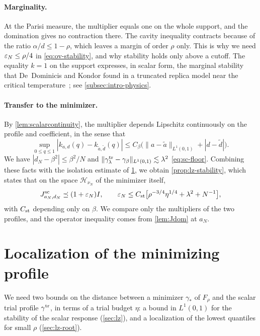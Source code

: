 \paragraph{Marginality.}
At the Parisi measure, the multiplier equals one on the whole support,
and the domination gives no contraction there. The cavity
inequality contracts because of the ratio $\alpha/d\le1-\rho$, which
leaves a margin of order $\rho$ only. This is why we need $\varepsilon_N\le\rho/4$ in
\eqref{eq:ov-stability}, and why stability holds only above a cutoff.
The equality $k=1$ on the support expresses, in scalar form, the
marginal stability that De~Dominicis and Kondor found in a truncated
replica model near the critical
temperature~\cite[pp.~606--608]{DeDominicisKondor1983}; see
\cref{subsec:intro-physics}.

\paragraph{Transfer to the minimizer.}
By \cref{lem:scalarcontinuity}, the multiplier depends Lipschitz
continuously on the profile and coefficient, in the sense that
\[
 \sup_{0\le q\le1}|k_{a,d}(q)-k_{\widetilde a,\widetilde d}(q)|
 \le C_\beta\bigl(\|a-\widetilde a\|_{L^1(0,1)}+|d-\widetilde d|\bigr).
\]
We have $|d_N-\beta^2|\le\beta^2/N$ and
$\|\gamma^{\rm tr}_\lambda-\gamma_\beta\|_{L^1(0,1)}\lesssim\lambda^2$
\eqref{eq:sc-floor}. Combining these facts with the isolation estimate
of \cref{sec:overview-localization}, we obtain \cref{prop:lz-stability},
which states that on the space $\mathcal H_{\nu_N}$ of the minimizer
itself,
\[
 J^{\mathrm{sc}}_{a_N,d_N}\preceq(1+\varepsilon_N)I,\qquad
 \varepsilon_N\le C_{\rm st}\bigl[\rho^{-3/4}\eta^{1/4}+\lambda^2+N^{-1}\bigr],
\]
with $C_{\rm st}$ depending only on $\beta$. We compare only the multipliers of
the two profiles, and the operator inequality comes from
\cref{lem:Jdom} at $a_N$.

\section{Localization of the minimizing profile}
\label{sec:overview-localization}

We need two bounds on the distance between a minimizer $\gamma_*$ of
$F_\rho$ and the scalar trial profile $\gamma^{\rm tr}$, in terms of a
trial budget $\eta$: a bound in $L^1(0,1)$ for the stability of the
scalar response (\cref{sec:lz}), and a localization of the lowest
quantiles for small $\rho$ (\cref{sec:lz-root}).

